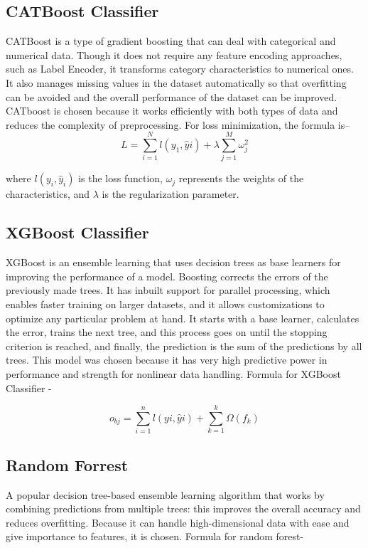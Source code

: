 \documentclass[conference]{IEEEtran}
\begin{document}
\subsection{CATBoost Classifier}\label{AA}

CATBoost is a type of gradient boosting that can deal with categorical and numerical data. Though it does not require any feature encoding approaches, such as Label Encoder, it transforms category characteristics to numerical ones. It also manages missing values in the dataset automatically so that overfitting can be avoided and the overall performance of the dataset can be improved.\cite{javapoint2025} CATboost is chosen because it works efficiently with both types of data and reduces the complexity of preprocessing. For loss minimization, the formula is-- 
\begin{equation}
   L=\sum_{i=1}^N l\left(y_1, \widehat{y} i\right)+\lambda \sum_{j=1}^M \omega_j^2
\end{equation}

where \( l(y_i, \hat{y}_i) \) is the loss function, \( \omega_j \) represents the weights of the characteristics, and \( \lambda \) is the regularization parameter.

\subsection{XGBoost Classifier}\label{AA}
XGBoost is an ensemble learning that uses decision trees as base learners for improving the performance of a model. Boosting corrects the errors of the previously made trees. It has inbuilt support for parallel processing, which enables faster training on larger datasets, and it allows customizations to optimize any particular problem at hand. It starts with a base learner, calculates the error, trains the next tree, and this process goes on until the stopping criterion is reached, and finally, the prediction is the sum of the predictions by all trees.\cite{geeksforgeeks2025} This model was chosen because it has very high predictive power in performance and strength for nonlinear data handling. Formula for XGBoost Classifier -

\begin{equation}
   o_{b j}=\sum_{i=1}^n l(y i, \widehat{y} i)+\sum_{k=1}^k \Omega\left(f_k\right)
\end{equation}

\subsection{Random Forrest}\label{AA}
A popular decision tree-based ensemble learning algorithm that works by combining predictions from multiple trees: this improves the overall accuracy and reduces overfitting. Because it can handle high-dimensional data with ease and give importance to features, it is chosen. Formula for random forest-
\end{document}
